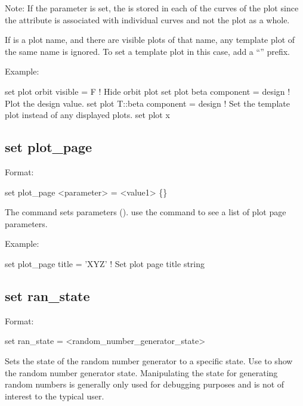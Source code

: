 {{{{{Note: If the  parameter is set, the  is stored in each of the curves of
the plot since the  attribute is associated with individual curves and not the plot as
a whole.

If  is a plot name, and there are visible plots of that name, any template plot
of the same name is ignored. To set a template plot in this case, add a ``'' prefix.

Example:
\begin{example}
  set plot orbit visible = F           ! Hide orbit plot
  set plot beta component = design     ! Plot the design value.
  set plot T::beta component = design  ! Set the template plot instead of any displayed plots.
  set plot x%
\end{example}


\subsection{set plot\_page}
\label{s:set.plot.page}

Format:
\begin{example}
  set plot_page <parameter> = <value1> \{<value2>\}
\end{example}

The  command sets  parameters ().
use the  command to see a list of plot page parameters.

Example:
\begin{example}
  set plot_page title = 'XYZ'  ! Set plot page title string
\end{example}


\subsection{set ran\_state}
\label{s:set.ran.state}

Format:
\begin{example}
  set ran_state = <random_number_generator_state>
\end{example}

Sets the state of the random number generator to a specific state. Use 
to show the random number generator state. Manipulating the state for generating random numbers is
generally only used for debugging purposes and is not of interest to the typical user.

}}}}}
